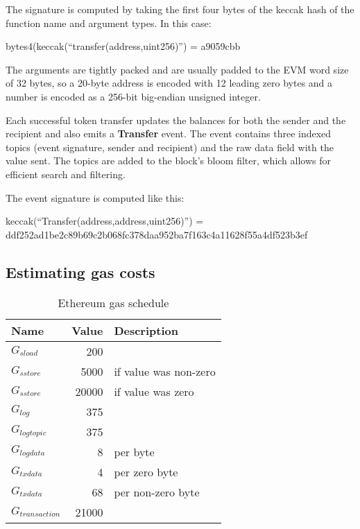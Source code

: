 \documentclass[12pt]{article}
\begin{document}
The signature is computed by taking the first four bytes of the keccak hash of the function name and argument types. In this case:
\begin{center}
	bytes4(keccak(``transfer(address,uint256)'') = a9059cbb
\end{center}

The arguments are tightly packed and are usually padded to the EVM word size of 32 bytes, so a 20-byte address is encoded with 12 leading zero bytes and a number is encoded as a 256-bit big-endian unsigned integer.

Each successful token transfer updates the balances for both the sender and the recipient and also emits a \textbf{Transfer} event.
The event contains three indexed topics (event signature, sender and recipient) and the raw data field with the value sent.
The topics are added to the block's bloom filter, which allows for efficient search and filtering.

The event signature is computed like this:
\begin{center}
	keccak(``Transfer(address,address,uint256)'') = ddf252ad1be2c89b69c2b068fc378daa952ba7f163c4a11628f55a4df523b3ef
\end{center}

\subsection{Estimating gas costs}

\begin{table}[h]
\caption{Ethereum gas schedule\cite{yellowpaper}}
\label{gas-costs}
\begin{center}
\begin{tabular}{l r l}
	Name & Value & Description \\ \hline
	$G_{sload}$ & 200 \\
	$G_{sstore}$ & 5000 & if value was non-zero \\
	$G_{sstore}$ & 20000 & if value was zero \\
	$G_{log}$ & 375 \\
	$G_{logtopic}$ & 375 \\
	$G_{logdata}$ & 8 & per byte \\
	$G_{txdata}$ & 4 & per zero byte \\
	$G_{txdata}$ & 68 & per non-zero byte \\
	$G_{transaction}$ & 21000
\end{tabular}
\end{center}
\end{table}
\end{document}
